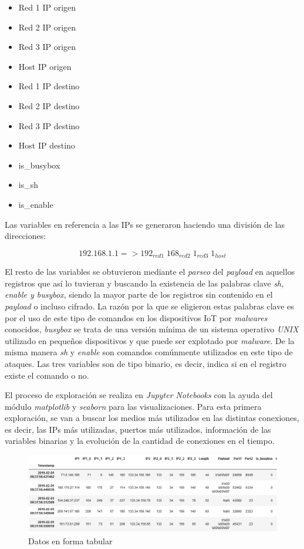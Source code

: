 \begin{itemize}
    \item Red 1 IP origen
    \item Red 2 IP origen
    \item Red 3 IP origen
    \item Host IP origen
    \item Red 1 IP destino
    \item Red 2 IP destino
    \item Red 3 IP destino
    \item Host IP destino
    \item is\_busybox
    \item is\_sh
    \item is\_enable
\end{itemize}

Las variables en referencia a las IPs se generaron haciendo una división de las direcciones:

\begin{equation}
    192.168.1.1 => 192_{red1}\; 168_{red2}\; 1_{red3}\; 1_{host}
\end{equation}

El resto de las variables se obtuvieron mediante el \textit{parseo} del \textit{payload} en aquellos registros que así lo tuvieran y buscando la existencia de las palabras clave \textit{sh, enable y busybox}, siendo la mayor parte de los registros sin contenido en el \textit{payload} o incluso cifrado. La razón por la que se eligieron estas palabras clave es por el uso de este tipo de comandos en los dispositivos IoT por \textit{malwares} conocidos, \textit{busybox} se trata de una versión mínima de un sistema operativo \textit{UNIX} utilizado en pequeños dispositivos y que puede ser explotado por \textit{malware}\cite{ibmiot}.  De la misma manera \textit{sh} y \textit{enable} son comandos comúnmente utilizados en este tipo de ataques. Las tres variables son de tipo binario, es decir, indica si en el registro existe el comando o no.

El proceso de exploración se realiza en \textit{Jupyter Notebooks} con la ayuda del módulo \textit{matplotlib} y \textit{seaborn} para las visualizaciones. Para esta primera exploración, se van a buscar los medios más utilizados en las distintas conexiones, es decir, las IPs más utilizadas, puertos más utilizados, información de las variables binarias y la evolución de la cantidad de conexiones en el tiempo.

\begin{figure}[H]
    \centering
    \includegraphics[width=15cm]{figs/initial_data.PNG}
    \caption{Datos en forma tabular}
    \label{fig:tabulardata}
\end{figure}

